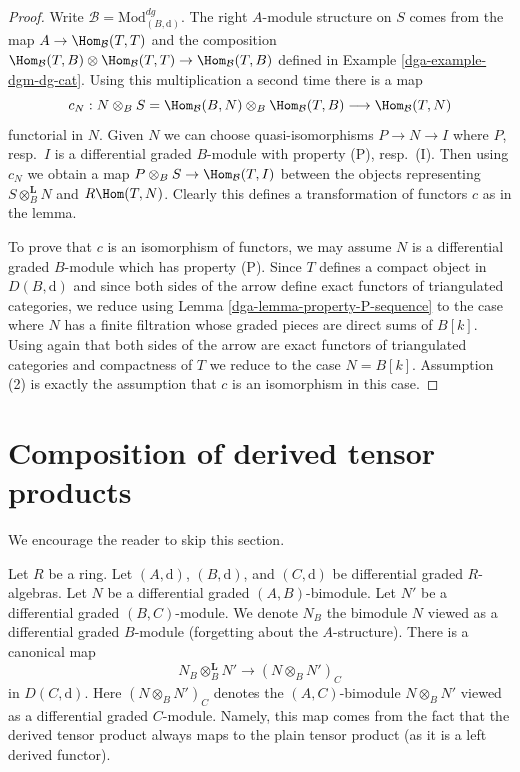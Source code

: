 \begin{proof}

Write $\mathcal{B} = \text{Mod}^{dg}_{(B, \text{d})}$.
The right $A$-module structure on $S$ comes from the map
$A \to \Hom_\mathcal{B}(T, T)$ and the composition
$\Hom_\mathcal{B}(T, B) \otimes \Hom_\mathcal{B}(T, T)
\to \Hom_\mathcal{B}(T, B)$ defined in Example \ref{dga-example-dgm-dg-cat}.
Using this multiplication a second time there is a map
$$
c_N :
N \otimes_B S = \Hom_\mathcal{B}(B, N) \otimes_B \Hom_\mathcal{B}(T, B)
\longrightarrow
\Hom_\mathcal{B}(T, N)
$$
functorial in $N$. Given $N$ we can choose quasi-isomorphisms
$P \to N \to I$ where $P$, resp.\ $I$ is a differential graded $B$-module
with property (P), resp.\ (I). Then using $c_N$ we obtain a map
$P \otimes_B S \to \Hom_\mathcal{B}(T, I)$ between the objects
representing $S \otimes_B^\mathbf{L} N$ and $R\Hom(T, N)$.
Clearly this defines a transformation of functors $c$ as in the lemma.

\medskip\noindent
To prove that $c$ is an isomorphism of functors, we may
assume $N$ is a differential graded $B$-module which
has property (P). Since $T$ defines a compact object in
$D(B, \text{d})$ and since both sides of the arrow define
exact functors of triangulated categories, we reduce using
Lemma \ref{dga-lemma-property-P-sequence}
to the case where $N$ has a finite filtration whose
graded pieces are direct sums of $B[k]$. Using again that
both sides of the arrow are exact functors of triangulated
categories and compactness of $T$ we reduce to
the case $N = B[k]$. Assumption (2) is exactly the
assumption that $c$ is an isomorphism in this case.
\end{proof}

\section{Composition of derived tensor products}
\label{dga-section-compose-tensor-functors}
We encourage the reader to skip this section.

\medskip\noindent
Let $R$ be a ring. Let $(A, \text{d})$, $(B, \text{d})$, and
$(C, \text{d})$ be differential graded $R$-algebras.
Let $N$ be a differential graded $(A, B)$-bimodule.
Let $N'$ be a differential graded $(B, C)$-module.
We denote $N_B$ the bimodule $N$ viewed as a differential graded
$B$-module (forgetting about the $A$-structure). There is a canonical map
\begin{equation}
\label{equation-plain-versus-derived}
N_B \otimes_B^\mathbf{L} N'
\longrightarrow
(N \otimes_B N')_C
\end{equation}
in $D(C, \text{d})$. Here $(N \otimes_B N')_C$ denotes the
$(A, C)$-bimodule $N \otimes_B N'$ viewed as a
differential graded $C$-module. Namely, this map
comes from the fact that the derived tensor product always maps to the
plain tensor product (as it is a left derived functor).

